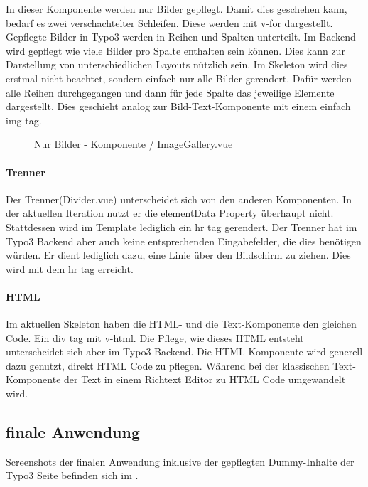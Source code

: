 In dieser Komponente werden nur Bilder gepflegt. Damit dies geschehen kann, bedarf es zwei verschachtelter Schleifen. Diese werden mit v-for dargestellt. Gepflegte Bilder in Typo3 werden in Reihen und Spalten unterteilt. Im Backend wird gepflegt wie viele Bilder pro Spalte enthalten sein können. Dies kann zur Darstellung von unterschiedlichen Layouts nützlich sein. Im Skeleton wird dies erstmal nicht beachtet, sondern einfach nur alle Bilder gerendert. Dafür werden alle Reihen durchgegangen und dann für jede Spalte das jeweilige Elemente dargestellt. Dies geschieht analog zur Bild-Text-Komponente mit einem einfach img tag.

\begin{figure}[htb]
\centering
{}
\caption{Nur Bilder - Komponente / ImageGallery.vue}
\label{fig:Nur Bilder - Komponente}
\end{figure}

\paragraph{Trenner}

Der Trenner(Divider.vue) unterscheidet sich von den anderen Komponenten. In der aktuellen Iteration nutzt er die elementData Property überhaupt nicht. Stattdessen wird im Template lediglich ein hr tag gerendert. Der Trenner hat im Typo3 Backend aber auch keine entsprechenden Eingabefelder, die dies benötigen würden. Er dient lediglich dazu, eine Linie über den Bildschirm zu ziehen. Dies wird mit dem hr tag erreicht.

\paragraph{HTML}

Im aktuellen Skeleton haben die HTML- und die Text-Komponente den gleichen Code. Ein div tag mit v-html. Die Pflege, wie dieses HTML entsteht unterscheidet sich aber im Typo3 Backend. Die HTML Komponente wird generell dazu genutzt, direkt HTML Code zu pflegen. Während bei der klassischen Text-Komponente der Text in einem Richtext Editor zu HTML Code umgewandelt wird.

\subsection{finale Anwendung}
\label{sec:finale Anwendung}

Screenshots der finalen Anwendung inklusive der gepflegten Dummy-Inhalte der Typo3 Seite befinden sich im .
